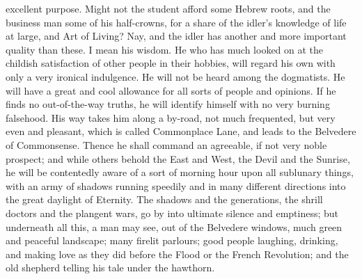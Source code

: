excellent purpose. Might not the student afford some Hebrew roots, and
the business man some of his half-crowns, for a share of the idler's
knowledge of life at large, and Art of Living? Nay, and the idler has
another and more important quality than these. I mean his wisdom. He
who has much looked on at the childish satisfaction of other people in
their hobbies, will regard his own with only a very ironical
indulgence. He will not be heard among the dogmatists. He will have a
great and cool allowance for all sorts of people and opinions. If he
finds no out-of-the-way truths, he will identify himself with no very
burning falsehood. His way takes him along a by-road, not much
frequented, but very even and pleasant, which is called Commonplace
Lane, and leads to the Belvedere of Commonsense.  Thence he
shall command an agreeable, if not very noble prospect; and while
others behold the East and West, the Devil and the Sunrise, he will be
contentedly aware of a sort of morning hour upon all sublunary things,
with an army of shadows running speedily and in many different
directions into the great daylight of Eternity. The shadows and the
generations, the shrill doctors and the plangent wars, go by into
ultimate silence and emptiness; but underneath all this, a man may
see, out of the Belvedere windows, much green and peaceful landscape;
many firelit parlours; good people laughing, drinking, and making love
as they did before the Flood or the French Revolution; and the old
shepherd telling his tale under the hawthorn.

